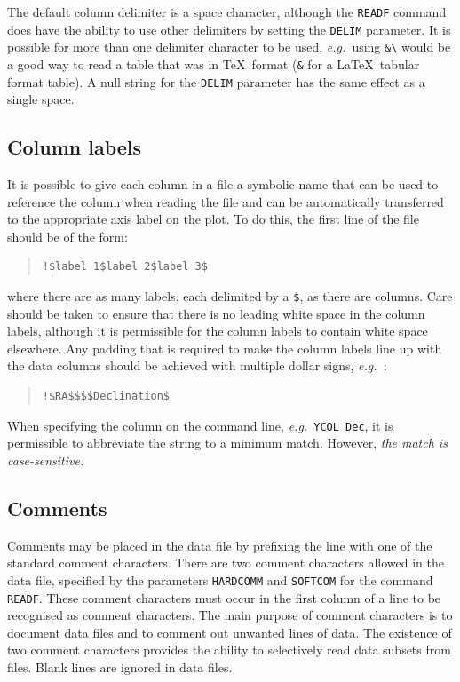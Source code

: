 \documentclass[twoside,11pt]{article}
\newcommand{\htmlref}[2]{#1}
\renewcommand{\_}{\texttt{\symbol{95}}}
\newcommand{\eg}{{\em e.g.\ }}
\newcommand{\pnam}[1]{{\tt #1}}
\newcommand{\cnam}[1]{{\tt #1}}
\newcommand{\iref} [1]{\htmlref{#1}{#1}}
\begin{document}
The default column delimiter is a space character, although the
\cnam{\iref{READF}} command does have the ability to use other
delimiters by setting the \pnam{DELIM} parameter.  It is possible for
more than one delimiter character to be used, \eg using \verb+&\+
would be a good way to read a table that was in \TeX\ format (\verb+&+
for a \LaTeX\ tabular format table).  A null string for the
\pnam{DELIM} parameter has the same effect as a single space.


\subsection{Column labels}

It is possible to give each column in a file a symbolic name that can be used
to reference the column when reading the file and can be automatically
transferred to the appropriate axis label on the plot.
To do this, the first line of the file should be of the form:
\begin{quote}
\begin{verbatim}
!$label 1$label 2$label 3$
\end{verbatim}
\end{quote}
where there are as many labels, each delimited by a \verb+$+, as there are
columns.
Care should be taken to ensure that there is no leading white space in the
column labels, although it is permissible for the column labels to contain
white space elsewhere.
Any padding that is required to make the column labels line up with the data
columns should be achieved with multiple dollar signs,
\eg:
\begin{quote}
\begin{verbatim}
!$RA$$$$Declination$
\end{verbatim}
\end{quote}
When specifying the column on the command line, \eg \cnam{YCOL Dec},
it is permissible to abbreviate the string to a minimum match.
However, {\em the match is case-sensitive.}


\subsection{Comments}

Comments may be placed in the data file by prefixing the line with one
of the standard comment characters.  There are two comment characters
allowed in the data file, specified by the parameters \pnam{HARDCOMM}
and \pnam{SOFTCOM} for the command \cnam{\iref{READF}}.  These comment
characters must occur in the first column of a line to be recognised
as comment characters.  The main purpose of comment characters is to
document data files and to comment out unwanted lines of data.  The
existence of two comment characters provides the ability to
selectively read data subsets from files.  Blank lines are ignored in
data files.
\end{document}
